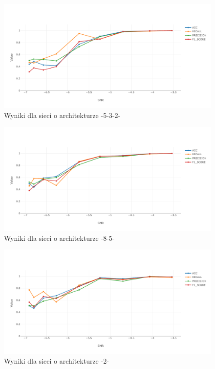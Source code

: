 \documentclass[inzynierska]{pwr_wmat_praca_dyplomowa}
\theoremstyle{plain}
\numberwithin{theorem}{chapter}
\theoremstyle{definition}
\numberwithin{theorem}{chapter}
\begin{document}
\begin{figure}[ht]
	\centering
	\includegraphics[width=14cm]{images/nn_small_532.pdf}
	\caption{Wyniki dla sieci o architekturze -5-3-2-}
	\label{wynik2-est-5-3-2}
\end{figure}
\begin{figure}[ht]
	\centering
	\includegraphics[width=14cm]{images/nn_small_85.pdf}
	\caption{Wyniki dla sieci o architekturze -8-5-}
	\label{wynik-est-8-5}
\end{figure}
\begin{figure}[ht]
	\centering
	\includegraphics[width=14cm]{images/nn_small_2.pdf}
	\caption{Wyniki dla sieci o architekturze -2-}
	\label{wynik-est-2}
\end{figure}
\end{document}
